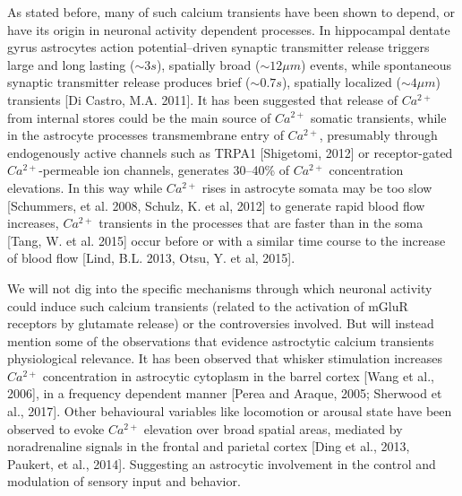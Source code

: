 As stated before, many of such calcium transients have been shown to depend, or have its origin in neuronal activity dependent processes. 
In hippocampal dentate gyrus astrocytes action potential–driven synaptic transmitter release triggers large and long lasting ($\sim3 s$), spatially broad ($\sim12 \mu m$) events, while spontaneous synaptic transmitter release produces brief ($\sim 0.7 s$), spatially localized ($\sim 4 \mu m$) transients [Di Castro, M.A. 2011].
It has been suggested that release of $Ca^{2+}$ from internal stores could be the main source of $Ca^{2+}$ somatic transients, while in the astrocyte processes transmembrane entry of $Ca^{2+}$, presumably through endogenously active channels such as TRPA1 [Shigetomi, 2012] or receptor-gated $Ca^{2+}$-permeable ion channels, generates 30–40\% of $Ca^{2+}$ concentration elevations. 
In this way while $Ca^{2+}$ rises in astrocyte somata may be too slow [Schummers, et al. 2008, Schulz, K. et al, 2012] to generate rapid blood flow increases, $Ca^{2+}$ transients in the processes that are faster than in the soma [Tang, W. et al. 2015] occur before or with a similar time course to the increase of blood flow [Lind, B.L. 2013, Otsu, Y. et al, 2015].

We will not dig into the specific mechanisms through which neuronal activity could induce such calcium transients (related to the activation of mGluR receptors by glutamate release) or the controversies involved. 
But will instead mention some of the observations that evidence astroctytic calcium transients physiological relevance. 
It has been observed that whisker stimulation increases $Ca^{2+}$ concentration in astrocytic cytoplasm in the barrel cortex [Wang et al., 2006], in a frequency dependent manner [Perea and Araque, 2005; Sherwood et al., 2017]. Other behavioural variables like locomotion or arousal state have been observed to evoke $Ca^{2+}$ elevation over broad spatial areas, mediated by noradrenaline signals in the frontal and parietal cortex [Ding et al., 2013, Paukert, et al., 2014].
Suggesting an astrocytic involvement in the control and modulation of sensory input and behavior. 
